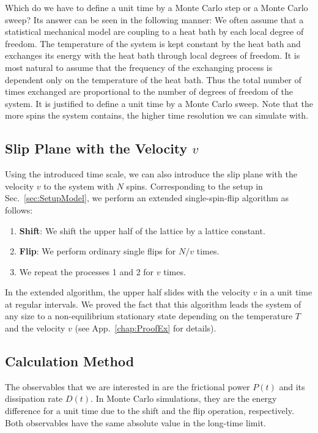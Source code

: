 Which do we have to define a unit time by a Monte Carlo step or a Monte Carlo sweep? Its answer can be seen in the following manner: We often assume that a statistical mechanical model are coupling to a heat bath by each local degree of freedom. The temperature of the system is kept constant by the heat bath and exchanges its energy with the heat bath through local degrees of freedom. It is most natural to assume that the frequency of the exchanging process is dependent only on the temperature of the heat bath. Thus the total number of times exchanged are proportional to the number of degrees of freedom of the system. It is justified to define a unit time by a Monte Carlo sweep. Note that the more spins the system contains, the higher time resolution we can simulate with.

\subsection{Slip Plane with the Velocity $v$}
Using the introduced time scale, we can also introduce the slip plane with the velocity $v$ to the system with $N$ spins. Corresponding to the setup in Sec.~\ref{sec:SetupModel}, we perform an extended single-spin-flip algorithm as follows:
\begin{enumerate}
	\item \textbf{Shift}: We shift the upper half of the lattice by a lattice constant.
	\item \textbf{Flip}: We perform ordinary single flips for $N/v$ times.
	\item We repeat the processes 1 and 2 for $v$ times.
\end{enumerate}
In the extended algorithm, the upper half slides with the velocity $v$ in a unit time at regular intervals. We proved the fact that this algorithm leads the system of any size to a non-equilibrium stationary state depending on the temperature $T$ and the velocity $v$ (see App.~\ref{chap:ProofEx} for details).

\subsection{Calculation Method}
The observables that we are interested in are the frictional power $P(t)$ and its dissipation rate $D(t)$. In Monte Carlo simulations, they are the energy difference for a unit time due to the shift and the flip operation, respectively. Both observables have the same absolute value in the long-time limit.

